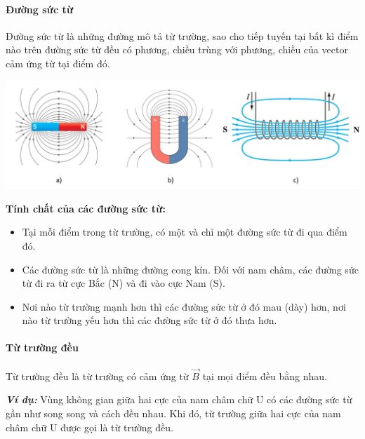 \begin{tomtat}
	\paragraph{Đường sức từ}
	\begin{dn}
		Đường sức từ là những đường mô tả từ trường, sao cho tiếp tuyến tại bất kì điểm nào trên đường sức từ đều có phương, chiều trùng với phương, chiều của vector cảm ứng từ tại điểm đó.
	\end{dn}
	\begin{center}
		\includegraphics[width=0.85\linewidth]{figs/VN12-Y24-PH-SYL-017-3}
	\end{center}
	\textbf{Tính chất của các đường sức từ:}
	\begin{tc}
		\begin{itemize}
			\item Tại mỗi điểm trong từ trường, có một và chỉ một đường sức từ đi qua điểm đó.
			\item Các đường sức từ là những đường cong kín. Đối với nam châm, các đường sức từ đi ra từ cực Bắc (N) và đi vào cực Nam (S).
			\item Nơi nào từ trường mạnh hơn thì các đường sức từ ở đó mau (dày) hơn, nơi nào từ trường yếu hơn thì các đường sức từ ở đó thưa hơn.
		\end{itemize}
	\end{tc}
	\paragraph{Từ trường đều}
	\begin{dn}
		Từ trường đều là từ trường có cảm ứng từ $\vec{B}$ tại mọi điểm đều bằng nhau.
	\end{dn}
	\textbf{\textit{Ví dụ:}} Vùng không gian giữa hai cực của nam châm chữ U có các đường sức từ gần như song song và cách đều nhau. Khi đó, từ trường giữa hai cực của nam châm chữ U được gọi là từ trường đều.

\end{tomtat}
